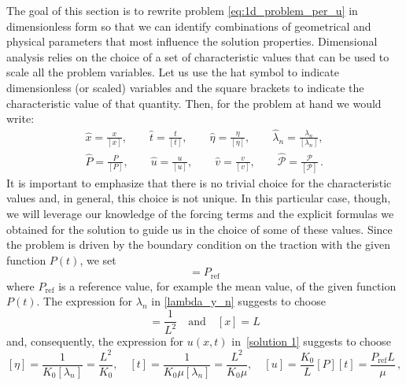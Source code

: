 \documentclass[12pt,a4paper]{amsart}
\theoremstyle{definition}
\newcommand{\hu}{\hat{u}}
\newcommand{\hx}{\hat{x}}
\newcommand{\hatt}{\hat{t}}
\newcommand{\heta}{\hat{\eta}}
\newcommand{\hv}{\hat{v}}
\newcommand{\hlambda}{\hat{\lambda}}
\begin{document}
The goal of this section is to rewrite problem \eqref{eq:1d_problem_per_u} in dimensionless form so that we can identify combinations of geometrical and physical parameters that most influence the solution properties. Dimensional analysis relies on the choice of a set of characteristic values that can be used to scale all the problem variables. Let us use the hat symbol to indicate dimensionless (or scaled) variables and the square brackets to indicate the characteristic value of that quantity. Then, for the problem at hand we would write:
%
\begin{equation} \label{starred variables}
\begin{array}{c}
\displaystyle\hx =\frac{x}{[x]},\qquad \hatt=\frac{t}{[t]},\qquad
\heta=\frac{\eta}{[\eta]}, \qquad \hlambda _{n} =\frac{\lambda _{n}}{[\lambda _{n}]},  \\[.1in]
\displaystyle\hat{P} = \frac{P}{[P]}, \qquad   \hu =\frac{u}{[u]},\qquad \hv=\frac{v}{[v]}, \qquad
 \hat{\mathcal{P}} =\frac{\mathcal P}{[\mathcal{P}]} \,.
\end{array}
\end{equation}
It is important to emphasize that there is no trivial choice for the characteristic values and, in general, this choice is not unique. In this particular case, though, we will leverage our knowledge of the forcing terms and the explicit formulas we obtained for the solution to guide us in the choice of some of these values. Since the problem is driven by the boundary condition on the traction with the given function $P(t)$, we set
\begin{equation}
[P]=P_{\text{ref}}
\end{equation}
where $P_{\text{ref}} $ is a reference value, for example the mean value, of the given function $P(t)$.
The expression for $\lambda_n$ in \eqref{lambda_y_n} suggests to choose
\begin{equation}
[\lambda_n]=\frac{1}{L^2} \quad \mbox{and} \quad [x]=L
\end{equation}
and, consequently, the expression for $u(x,t)$ in~\eqref{solution 1} suggests
to choose
\begin{equation}\label{eq:scalf_eta}
[\eta] = \frac{1}{K_0[\lambda_n]} = \frac{L^2}{K_0}, \quad
[t] =  \frac{1}{K_0\mu[\lambda_n]} = \frac{L^2}{K_0\mu},
\quad
[u] = \frac{K_0}{L}[P][t] = \frac{P_{\text{ref}} L}{\mu}
\,,
\end{equation}
\end{document}

